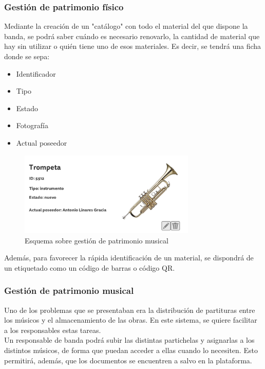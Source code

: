 \documentclass[11pt,spanish]{article}
\begin{document}
\subsubsection{Gestión de patrimonio físico}
Mediante la creación de un "catálogo" con todo el material del que dispone la banda,
se podrá saber cuándo es necesario renovarlo, la cantidad de material que hay sin utilizar
o quién tiene uno de esos materiales. Es decir, se tendrá una ficha donde se sepa:

\begin{itemize}
  \item Identificador
  \item Tipo
  \item Estado
  \item Fotografía
  \item Actual poseedor
\end{itemize}

\begin{figure}[!h]
\centering
\includegraphics[width=0.75\textwidth]{img/patrimoniofisico.jpg}
\caption{Esquema sobre gestión de patrimonio musical}
\end{figure}

Además, para favorecer la rápida identificación de un material, se
dispondrá de un etiquetado como un código de barras o código QR.


\subsubsection{Gestión de patrimonio musical}
Uno de los problemas que se presentaban era la distribución de partituras entre los
músicos y el almacenamiento de las obras. En este sistema, se quiere facilitar a los
responsables estas tareas.\\
Un responsable de banda podrá subir las distintas partichelas y asignarlas a los
distintos músicos, de forma que puedan acceder a ellas cuando lo necesiten. Esto
permitirá, además, que los documentos se encuentren a salvo en la plataforma.
\end{document}
